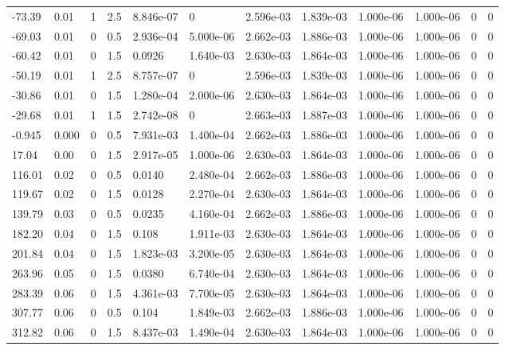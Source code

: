 \documentclass[preview]{standalone}
\begin{document}
{{\begin{tabular}{L{1.2cm}C{1.2cm} C{0.3cm}C{0.5cm} C{1.4cm}C{1.4cm} C{1.4cm}C{1.4cm} C{1.6cm}C{1.6cm} C{1.6cm}C{1.6cm}}
  -73.39  &  0.01  & 1     & 2.5 &  8.846e-07  & 0  &  2.596e-03&   1.839e-03& 1.000e-06 & 1.000e-06   &  0 & 0  \\ 
  -69.03  &  0.01  & 0     & 0.5 &  2.936e-04  & 5.000e-06  &  2.662e-03&   1.886e-03& 1.000e-06 & 1.000e-06   &  0 & 0  \\ 
  -60.42  &  0.01  & 0     & 1.5 &  0.0926  & 1.640e-03  &  2.630e-03&   1.864e-03& 1.000e-06 & 1.000e-06   &  0 & 0  \\ 
  -50.19  &  0.01  & 1     & 2.5 &  8.757e-07  & 0  &  2.596e-03&   1.839e-03& 1.000e-06 & 1.000e-06   &  0 & 0  \\ 
  -30.86  &  0.01  & 0     & 1.5 &  1.280e-04  & 2.000e-06  &  2.630e-03&   1.864e-03& 1.000e-06 & 1.000e-06   &  0 & 0  \\ 
  -29.68  &  0.01  & 1     & 1.5 &  2.742e-08  & 0  &  2.663e-03&   1.887e-03& 1.000e-06 & 1.000e-06   &  0 & 0  \\ 
  -0.945  &  0.000  & 0     & 0.5 &  7.931e-03  & 1.400e-04  &  2.662e-03&   1.886e-03& 1.000e-06 & 1.000e-06   &  0 & 0  \\ 
  17.04  &  0.00  & 0     & 1.5 &  2.917e-05  & 1.000e-06  &  2.630e-03&   1.864e-03& 1.000e-06 & 1.000e-06   &  0 & 0  \\ 
  116.01  &  0.02  & 0     & 0.5 &  0.0140  & 2.480e-04  &  2.662e-03&   1.886e-03& 1.000e-06 & 1.000e-06   &  0 & 0  \\ 
  119.67  &  0.02  & 0     & 1.5 &  0.0128  & 2.270e-04  &  2.630e-03&   1.864e-03& 1.000e-06 & 1.000e-06   &  0 & 0  \\ 
  139.79  &  0.03  & 0     & 0.5 &  0.0235  & 4.160e-04  &  2.662e-03&   1.886e-03& 1.000e-06 & 1.000e-06   &  0 & 0  \\ 
  182.20  &  0.04  & 0     & 1.5 &  0.108  & 1.911e-03  &  2.630e-03&   1.864e-03& 1.000e-06 & 1.000e-06   &  0 & 0  \\ 
  201.84  &  0.04  & 0     & 1.5 &  1.823e-03  & 3.200e-05  &  2.630e-03&   1.864e-03& 1.000e-06 & 1.000e-06   &  0 & 0  \\ 
  263.96  &  0.05  & 0     & 1.5 &  0.0380  & 6.740e-04  &  2.630e-03&   1.864e-03& 1.000e-06 & 1.000e-06   &  0 & 0  \\ 
  283.39  &  0.06  & 0     & 1.5 &  4.361e-03  & 7.700e-05  &  2.630e-03&   1.864e-03& 1.000e-06 & 1.000e-06   &  0 & 0  \\ 
  307.77  &  0.06  & 0     & 0.5 &  0.104  & 1.849e-03  &  2.662e-03&   1.886e-03& 1.000e-06 & 1.000e-06   &  0 & 0  \\ 
  312.82  &  0.06  & 0     & 1.5 &  8.437e-03  & 1.490e-04  &  2.630e-03&   1.864e-03& 1.000e-06 & 1.000e-06   &  0 & 0  \\ 

\end{tabular}}}
\end{document}
